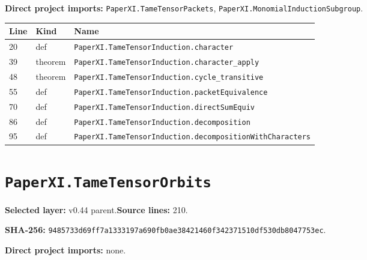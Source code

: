\documentclass[10pt,oneside]{book}
\begin{document}
\textbf{Direct project imports:} \nolinkurl{PaperXI.TameTensorPackets}, \nolinkurl{PaperXI.MonomialInductionSubgroup}.

\begin{longtable}{@{}p{}p{}p{}@{}}\toprule Line&Kind&Name\\\midrule\endhead

20&def&\nolinkurl{PaperXI.TameTensorInduction.character}\\

39&theorem&\nolinkurl{PaperXI.TameTensorInduction.character_apply}\\

48&theorem&\nolinkurl{PaperXI.TameTensorInduction.cycle_transitive}\\

55&def&\nolinkurl{PaperXI.TameTensorInduction.packetEquivalence}\\

70&def&\nolinkurl{PaperXI.TameTensorInduction.directSumEquiv}\\

86&def&\nolinkurl{PaperXI.TameTensorInduction.decomposition}\\

95&def&\nolinkurl{PaperXI.TameTensorInduction.decompositionWithCharacters}\\

\bottomrule\end{longtable}

\section{\texorpdfstring{\nolinkurl{PaperXI.TameTensorOrbits}}{PaperXI.TameTensorOrbits}}\label{module:PaperXI.TameTensorOrbits}

\textbf{Selected layer:} v0.44 parent.\quad\textbf{Source lines:} 210.\par\textbf{SHA-256:} {\scriptsize\nolinkurl{9485733d69ff7a1333197a690fb0ae38421460f342371510df530db8047753ec}}.


\textbf{Direct project imports:} none.
\end{document}
